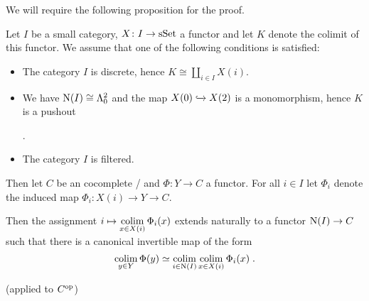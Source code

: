 We will require the following proposition for the proof.
\begin{prop}\label{prop:colimitDecompositionPushouts} 
    Let $I$ be a small category, $X\colon I\to\operatorname{sSet}$ a functor and let $K$ denote the colimit of this functor.
    We assume that one of the following conditions is satisfied:
    \begin{itemize}
        \item The category $I$ is discrete, hence $K\cong\coprod\limits_{i\in I}X(i)$.
        \item We have $\operatorname{N}(I)\cong\Lambda_0^2$ and the map $X(0)\xhookrightarrow{} X(2)$ is a monomorphism, hence $K$ is a pushout \begin{center}
                \;.
            \end{center}
        \item The category $I$ is filtered.
    \end{itemize}
    Then let $C$ be an cocomplete \inftycat/ and $\Phi\colon Y\to C$ a functor.
    For all $i\in I$ let $\Phi_i$ denote the induced map $\Phi_i\colon X(i)\to Y\to C$.

    Then the assignment $i\mapsto\operatorname*{colim}\limits_{x\in X(i)} \Phi_i(x)$ extends naturally to a functor $\operatorname{N}(I)\to C$ such that there is a canonical invertible map of the form 
    \begin{equation*}
        \operatorname*{colim}\limits_{y\in Y}\Phi(y)\simeq\operatorname*{colim}\limits_{i\in\operatorname{N}(I)}\operatorname*{colim}\limits_{x\in X(i)}\Phi_i(x)\;.
    \end{equation*}
    \begin{reference}
        \cite[Proposition 7.3.16]{cisinski_2019} (applied to $C^{\operatorname{op}}$)
    \end{reference}
\end{prop}
